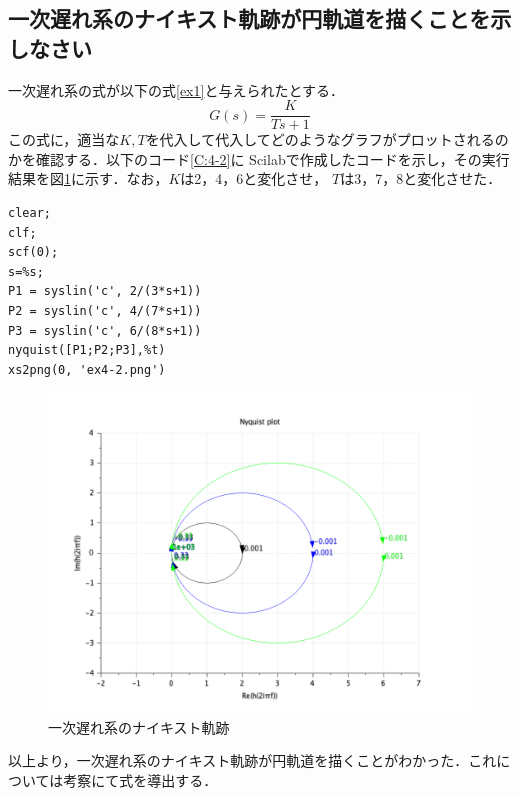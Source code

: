 \documentclass[a4paper,11pt]{jsarticle}
\begin{document}
  \subsection{一次遅れ系のナイキスト軌跡が円軌道を描くことを示しなさい}
  一次遅れ系の式が以下の式\ref{ex1}と与えられたとする．
  \begin{equation}
    G(s) = \frac{K}{Ts+1} \label{ex1}
  \end{equation}
  この式に，適当な$K,T$を代入して代入してどのようなグラフがプロットされるのかを確認する．以下のコード\ref{C:4-2}に
  Scilabで作成したコードを示し，その実行結果を図\ref{G:4-2}に示す．なお，$K$は2，4，6と変化させ，
  $T$は3，7，8と変化させた．
  \begin{lstlisting}[caption=一次遅れ系のナイキスト軌跡, label=C:4-2]
clear;
clf;
scf(0);
s=%s;
P1 = syslin('c', 2/(3*s+1))
P2 = syslin('c', 4/(7*s+1))
P3 = syslin('c', 6/(8*s+1))
nyquist([P1;P2;P3],%t)
xs2png(0, 'ex4-2.png')
  \end{lstlisting}
  \begin{figure}[H]
    \centering
    \includegraphics[width=0.8\linewidth]{picture/ex4-2.png}
    \caption{一次遅れ系のナイキスト軌跡}
    \label{G:4-2}
  \end{figure}
  以上より，一次遅れ系のナイキスト軌跡が円軌道を描くことがわかった．これについては考察にて式を導出する．
\end{document}
